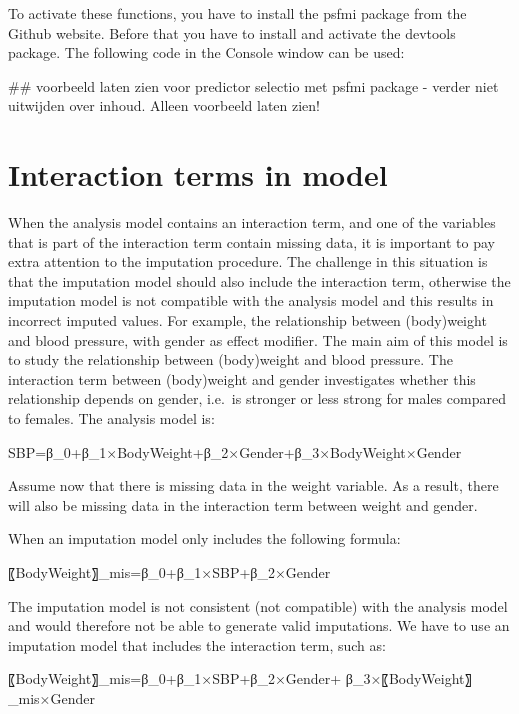 \documentclass[]{book}
\newenvironment{Shaded}{\begin{snugshade}}{\end{snugshade}}
\newcommand{\NormalTok}[1]{#1}
\theoremstyle{definition}
\theoremstyle{definition}
\theoremstyle{definition}
\theoremstyle{remark}
\begin{document}
To activate these functions, you have to install the psfmi package from
the Github website. Before that you have to install and activate the
devtools package. The following code in the Console window can be used:

\begin{Shaded}
\begin{Highlighting}[]
\NormalTok{## voorbeeld laten zien voor predictor selectio met psfmi package - verder niet uitwijden over inhoud. Alleen voorbeeld laten zien!}
\end{Highlighting}
\end{Shaded}

\section{Interaction terms in model}\label{interaction-terms-in-model}

When the analysis model contains an interaction term, and one of the
variables that is part of the interaction term contain missing data, it
is important to pay extra attention to the imputation procedure. The
challenge in this situation is that the imputation model should also
include the interaction term, otherwise the imputation model is not
compatible with the analysis model and this results in incorrect imputed
values. For example, the relationship between (body)weight and blood
pressure, with gender as effect modifier. The main aim of this model is
to study the relationship between (body)weight and blood pressure. The
interaction term between (body)weight and gender investigates whether
this relationship depends on gender, i.e.~is stronger or less strong for
males compared to females. The analysis model is:

SBP=β\_0+β\_1×BodyWeight+β\_2×Gender+β\_3×BodyWeight×Gender

Assume now that there is missing data in the weight variable. As a
result, there will also be missing data in the interaction term between
weight and gender.

When an imputation model only includes the following formula:

〖BodyWeight〗\_mis=β\_0+β\_1×SBP+β\_2×Gender

The imputation model is not consistent (not compatible) with the
analysis model and would therefore not be able to generate valid
imputations. We have to use an imputation model that includes the
interaction term, such as:

〖BodyWeight〗\_mis=β\_0+β\_1×SBP+β\_2×Gender+
β\_3×〖BodyWeight〗\_mis×Gender
\end{document}
